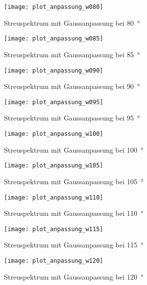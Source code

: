 \documentclass[11pt, ngerman, fleqn, DIV=15, headinclude, BCOR=2cm]{scrreprt}
\begin{document}
\begin{appendix}
\begin{figure}[h]
    \centering
    \texttt{[image: plot\_anpassung\_w080]}
    \caption{%
	    Streuspektrum mit Gaussanpassung bei \SI{80}{\degree}
    }
    \label{fig:plot_anpassung_w080}
\end{figure}

\begin{figure}[h]
    \centering
    \texttt{[image: plot\_anpassung\_w085]}
    \caption{%
	    Streuspektrum mit Gaussanpassung bei \SI{85}{\degree}
    }
    \label{fig:plot_anpassung_w085}
\end{figure}

\begin{figure}[h]
    \centering
    \texttt{[image: plot\_anpassung\_w090]}
    \caption{%
	    Streuspektrum mit Gaussanpassung bei \SI{90}{\degree}
    }
    \label{fig:plot_anpassung_w090}
\end{figure}

\begin{figure}[h]
    \centering
    \texttt{[image: plot\_anpassung\_w095]}
    \caption{%
	    Streuspektrum mit Gaussanpassung bei \SI{95}{\degree}
    }
    \label{fig:plot_anpassung_w095}
\end{figure}

\begin{figure}[h]
    \centering
    \texttt{[image: plot\_anpassung\_w100]}
    \caption{%
	    Streuspektrum mit Gaussanpassung bei \SI{100}{\degree}
    }
    \label{fig:plot_anpassung_w100}
\end{figure}

\begin{figure}[h]
    \centering
    \texttt{[image: plot\_anpassung\_w105]}
    \caption{%
	    Streuspektrum mit Gaussanpassung bei \SI{105}{\degree}
    }
    \label{fig:plot_anpassung_w105}
\end{figure}

\begin{figure}[h]
    \centering
    \texttt{[image: plot\_anpassung\_w110]}
    \caption{%
	    Streuspektrum mit Gaussanpassung bei \SI{110}{\degree}
    }
    \label{fig:plot_anpassung_w110}
\end{figure}

\begin{figure}[h]
    \centering
    \texttt{[image: plot\_anpassung\_w115]}
    \caption{%
	    Streuspektrum mit Gaussanpassung bei \SI{115}{\degree}
    }
    \label{fig:plot_anpassung_w115}
\end{figure}

\begin{figure}[h]
    \centering
    \texttt{[image: plot\_anpassung\_w120]}
    \caption{%
	    Streuspektrum mit Gaussanpassung bei \SI{120}{\degree}
    }
    \label{fig:plot_anpassung_w120}
\end{figure}

\clearpage



\end{appendix}
\end{document}
